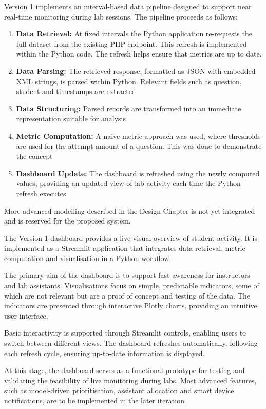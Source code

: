 Version 1 implements an interval-based data pipeline designed to support near real-time monitoring during lab sessions. The pipeline proceeds as follows:
\begin{enumerate}
    \item \textbf{Data Retrieval: }At fixed intervals the Python application re-requests the full dataset from the existing PHP endpoint. This refresh is implemented within the Python code. The refresh helps ensure that metrics are up to date.
    \item \textbf{Data Parsing: }The retrieved response, formatted as JSON with embedded XML strings, is parsed within Python. Relevant fields such as question, student and timestamps are extracted
    \item \textbf{Data Structuring: }Parsed records are transformed into an immediate representation suitable for analysis
    \item \textbf{Metric Computation: }A naive metric approach was used, where thresholds are used for the attempt amount of a question. This was done to demonstrate the concept
    \item \textbf{Dashboard Update: }The dashboard is refreshed using the newly computed values, providing an updated view of lab activity each time the Python refresh executes
\end{enumerate}
More advanced modelling described in the Design Chapter is not yet integrated and is reserved for the proposed system.


The Version 1 dashboard provides a live visual overview of student activity. It is implemented as a Streamlit application that integrates data retrieval, metric computation and visualisation in a Python workflow.

The primary aim of the dashboard is to support fast awareness for instructors and lab assistants. Visualisations focus on simple, predictable indicators, some of which are not relevant but are a proof of concept and testing of the data. The indicators are presented through interactive Plotly charts, providing an intuitive user interface.

Basic interactivity is supported through Streamlit controls, enabling users to switch between different views. The dashboard refreshes automatically, following each refresh cycle, ensuring up-to-date information is displayed.

At this stage, the dashboard serves as a functional prototype for testing and validating the feasibility of live monitoring during labs. Most advanced features, such as model-driven prioritisation, assistant allocation and smart device notifications, are to be implemented in the later iteration.
